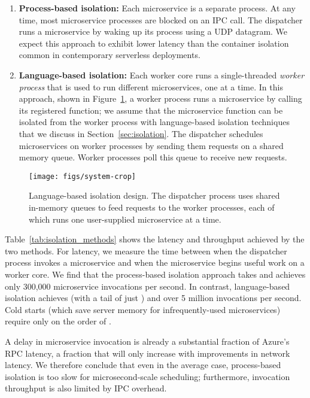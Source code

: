 \begin{enumerate}
\item \textbf{Process-based isolation:} Each microservice is a separate process.
At any time, most microservice processes are blocked on an IPC
call. The dispatcher runs a microservice by waking up its process using a UDP datagram.
We expect this approach to exhibit lower latency than the container isolation common
in contemporary serverless deployments.
\item \textbf{Language-based isolation:} Each worker core runs a single-threaded
\emph{worker process} that is used to run different microservices, one at a time.
In this approach, shown in Figure~\ref{fig:sysdesign}, a worker process runs a
microservice by calling its registered
function; we assume that the microservice function can be isolated from the
worker process with language-based isolation techniques that we discuss in
Section~\ref{sec:isolation}. The dispatcher schedules microservices on worker
processes by sending them
requests on a shared memory queue. Worker processes poll this queue to receive
new requests.
\end{enumerate}

\begin{figure}
\texttt{[image: figs/system-crop]}
\caption{Language-based isolation design.  The dispatcher process
uses shared in-memory queues to feed requests to the worker processes, each of
which runs one user-supplied microservice at a time.}
\label{fig:sysdesign}
\end{figure}

Table~\ref{tab:isolation_methods} shows the latency and throughput achieved
by the two methods. For latency, we measure the time between when the dispatcher
process invokes a microservice and when the microservice begins
useful work on a worker core. We find that the process-based isolation approach
takes  and achieves only 300,000 microservice invocations per
second. In contrast, language-based isolation achieves  (with a tail
of just ) and over 5 million invocations per second.  Cold starts
(which save server memory for infrequently-used microservices)
require only on the order of .

A  delay in microservice invocation is already a substantial fraction of
Azure's  RPC latency, a fraction that will only increase with
improvements in network latency. We therefore conclude that even in the average case,
process-based isolation is too slow for microsecond-scale scheduling; furthermore,
invocation throughput is also limited by IPC overhead.

